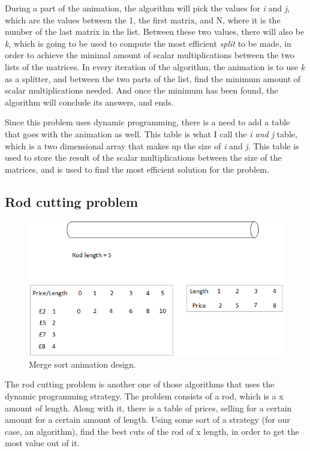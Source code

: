 During a part of the animation, the algorithm will pick the values for \textit{i} and \textit{j}, which are the values between the 1, the first matrix, and N, where it is the number of the last matrix in the list. Between these two values, there will also be \textit{k}, which is going to be used to compute the most efficient \textit{split} to be made, in order to achieve the minimal amount of scalar multiplications between the two lists of the matrices. In every iteration of the algorithm, the animation is to use \textit{k} as a splitter, and between the two parts of the list, find the minimum amount of scalar multiplications needed. And once the minimum has been found, the algorithm will conclude its answers, and ends.

Since this problem uses dynamic programming, there is a need to add a table that goes with the animation as well. This table is what I call the \textit{i and j} table, which is a two dimensional array that makes up the size of \textit{i} and \textit{j}. This table is used to store the result of the scalar multiplications between the size of the matrices, and is used to find the most efficient solution for the problem. 

\subsection{Rod cutting problem}

\begin{figure}[H]
\centering
\includegraphics[scale=0.9]{images/report_images/animationDesignRodCuttingProblem.png}
\caption{Merge sort animation design.}
\label{animationDesignRodCuttingProblem}
\end{figure}

The rod cutting problem is another one of those algorithms that uses the dynamic programming strategy. The problem consists of a rod, which is a x amount of length. Along with it, there is a table of prices, selling for a certain amount for a certain amount of length. Using some sort of a strategy (for our case, an algorithm), find the best cuts of the rod of x length, in order to get the most value out of it.

